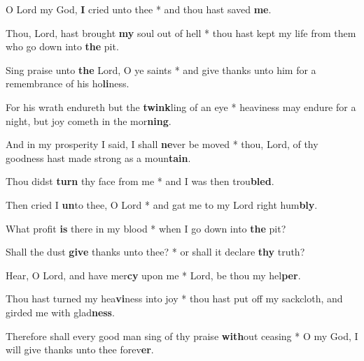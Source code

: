 \begin{multicols}{2}
	O Lord my God, \textbf{I} cried unto thee * and thou hast saved \textbf{me}.
	
	Thou, Lord, hast brought \textbf{my} soul out of hell * thou hast kept my life from them who go down into \textbf{the} pit.
	
	Sing praise unto \textbf{the} Lord, O ye saints * and give thanks unto him for a remembrance of his ho\textbf{li}ness.
	
	For his wrath endureth but the \textbf{twink}ling of an eye * heaviness may endure for a night, but joy cometh in the mor\textbf{ning}.
	
	And in my prosperity I said, I shall \textbf{ne}ver be moved * thou, Lord, of thy goodness hast made strong as a moun\textbf{tain}.
	
	Thou didst \textbf{turn} thy face from me * and I was then trou\textbf{bled}.
	
	Then cried I \textbf{un}to thee, O Lord * and gat me to my Lord right hum\textbf{bly}.
	
	What profit \textbf{is} there in my blood * when I go down into \textbf{the} pit?
	
	Shall the dust \textbf{give} thanks unto thee? * or shall it declare \textbf{thy} truth?
	
	Hear, O Lord, and have mer\textbf{cy} upon me * Lord, be thou my hel\textbf{per}.
	
	Thou hast turned my hea\textbf{vi}ness into joy * thou hast put off my sackcloth, and girded me with glad\textbf{ness}.
	
	Therefore shall every good man sing of thy praise \textbf{with}out ceasing * O my God, I will give thanks unto thee forev\textbf{er}.
\end{multicols}